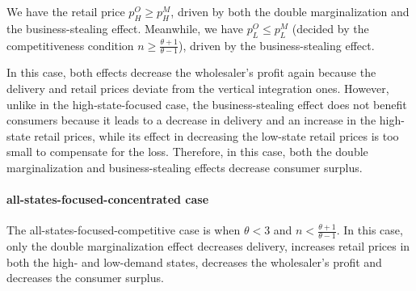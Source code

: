 \documentclass[12pt]{article}
\begin{document}
We have the retail price $p^O_{H} \geq p^M_{H}$, driven by both the double marginalization and the business-stealing effect. Meanwhile, we have $p^O_{L} \leq p^M_{L}$ (decided by the competitiveness condition  $n \geq \frac{\theta + 1}{\theta - 1}$), driven by the business-stealing effect. 

In this case, both effects decrease the wholesaler's profit again because the delivery and retail prices deviate from the vertical integration ones. However, unlike in the high-state-focused case, the business-stealing effect does not benefit consumers because it leads to a decrease in delivery and an increase in the high-state retail prices, while its effect in decreasing the low-state retail prices is too small to compensate for the loss. Therefore,  in this case, both the double marginalization and business-stealing effects decrease consumer surplus.



\paragraph{all-states-focused-concentrated case}
The all-states-focused-competitive case is when $\theta < 3$ and $n < \frac{\theta + 1}{\theta - 1}$. In this case, only the double marginalization effect decreases delivery, increases retail prices in both the high- and low-demand states, decreases the wholesaler's profit and decreases the consumer surplus. 








\end{document}
